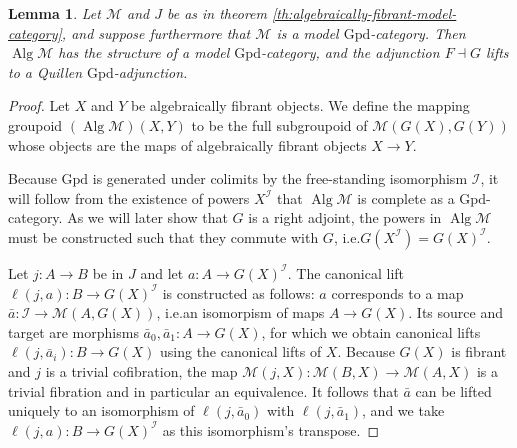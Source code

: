 \documentclass[a4paper]{article}
\newtheorem{lemma}[theorem]{Lemma}
\theoremstyle{remark}
\theoremstyle{definition}
\begin{document}
\begin{lemma}
  \label{lem:algebraically-fibrant-lproper-simplicial}
  Let $\mathcal{M}$ and $J$ be as in theorem \ref{th:algebraically-fibrant-model-category}, and suppose furthermore that $\mathcal{M}$ is a model $\mathrm{Gpd}$-category.
  Then $\operatorname{Alg} \mathcal{M}$ has the structure of a model $\mathrm{Gpd}$-category, and the adjunction $F \dashv G$ lifts to a Quillen $\mathrm{Gpd}$-adjunction.
\end{lemma}
\begin{proof}
  Let $X$ and $Y$ be algebraically fibrant objects.
  We define the mapping groupoid $(\operatorname{Alg} \mathcal{M})(X, Y)$ to be the full subgroupoid of $\mathcal{M}(G(X), G(Y))$ whose objects are the maps of algebraically fibrant objects $X \rightarrow Y$.

  Because $\mathrm{Gpd}$ is generated under colimits by the free-standing isomorphism $\mathcal{I}$, it will follow from the existence of powers $X^\mathcal{I}$ that $\operatorname{Alg} \mathcal{M}$ is complete as a $\mathrm{Gpd}$-category.
  As we will later show that $G$ is a right adjoint, the powers in $\operatorname{Alg} \mathcal{M}$ must be constructed such that they commute with $G$, i.e.\@ $G(X^\mathcal{I}) = G(X)^\mathcal{I}$.

  Let $j : A \rightarrow B$ be in $J$ and let $a : A \rightarrow G(X)^\mathcal{I}$.
  The canonical lift $\ell(j, a) : B \rightarrow G(X)^\mathcal{I}$ is constructed as follows:
  $a$ corresponds to a map $\bar a : \mathcal{I} \rightarrow \mathcal{M}(A, G(X))$, i.e.\@ an isomorpism of maps $A \rightarrow G(X)$.
  Its source and target are morphisms $\bar a_0, \bar a_1 : A \rightarrow G(X)$, for which we obtain canonical lifts $\ell(j, \bar a_i) : B \rightarrow G(X)$ using the canonical lifts of $X$.
  Because $G(X)$ is fibrant and $j$ is a trivial cofibration, the map $\mathcal{M}(j, X) : \mathcal{M}(B, X) \rightarrow \mathcal{M}(A, X)$ is a trivial fibration and in particular an equivalence.
  It follows that $\bar a$ can be lifted uniquely to an isomorphism of $\ell(j, \bar a_0)$ with $\ell(j, \bar a_1)$, and we take $\ell(j, a) : B \rightarrow G(X)^\mathcal{I}$ as this isomorphism's transpose.


\end{proof}
\end{document}
